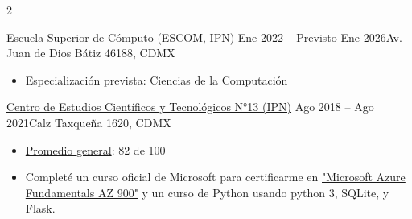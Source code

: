 \documentclass[10pt,a4paper,ragged2e,withhyper]{altacv}
\begin{document}
\begin{paracol}{2}

  {\href{https://es.wikipedia.org/wiki/Escuela_Superior_de_Cómputo}
  {Escuela Superior de Cómputo (\color{ColorLinks}ESCOM, IPN\color{black})}}
  {Ene 2022 -- Previsto Ene 2026}{Av. Juan de Dios Bátiz 46188, CDMX}
  \begin{itemize}
    \item Especialización prevista: Ciencias de la Computación
  \end{itemize}
  \divider
  {{\href{https://www.cecyt13.ipn.mx}
  {Centro de Estudios Científicos y Tecnológicos N°13 (\color{ColorLinks}IPN\color{black})}}}
  {Ago 2018 -- Ago 2021}{Calz Taxqueña 1620, CDMX}
  \begin{itemize}
    \item {\href{https://drive.google.com/file/d/1osz7QmjWUH6OcZ8AOrqVXEIJf-Pet3Q5/view?usp=sharing}{\color{ColorLinks}Promedio
    general\color{black}}}: 82 de 100
  \end{itemize}
  \divider
  \begin{itemize}
    \item Completé un curso oficial de Microsoft para certificarme en
    {\href{https://drive.google.com/file/d/1iRQRtXmNAItFIWmfjOP1m_35C4pAPpTP/view?usp=sharing}{\color{ColorLinks}"Microsoft
    Azure Fundamentals AZ 900"\color{black}}} y un curso de Python usando python
    3, SQLite, y Flask.
  \end{itemize}

  \switchcolumn

  \\
  \\
  \\
  \\
  \\


\end{paracol}
\end{document}
